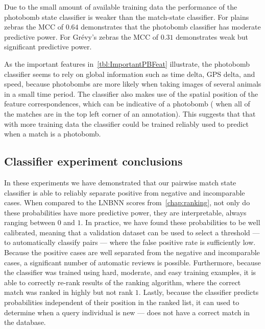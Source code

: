         Due to the small amount of available training data the performance of the photobomb state classifier is
          weaker than the match-state classifier.
        For plains zebras the MCC of $0.64$ demonstrates that the photobomb classifier has moderate predictive
          power.
        For Grévy's zebras the MCC of $0.31$ demonstrates weak but significant predictive power.

        As the important features in~\cref{tbl:ImportantPBFeat} illustrate, the photobomb classifier seems to
          rely on global information such as time delta, GPS delta, and speed, because photobombs are more likely
          when taking images of several animals in a small time period.
        The classifier also makes use of the spatial position of the feature correspondences, which can be
          indicative of a photobomb (\eg{} when all of the matches are in the top left corner of an annotation).
        This suggests that that with more training data the classifier could be trained reliably used to predict
          when a match is a photobomb.

        \ConfusionPhotobomb{}

        \EvalMetricsPhotobomb{}

        \ImportantPBFeat{}

    \FloatBarrier{}
    \subsection{Classifier experiment conclusions}
        In these experiments we have demonstrated that our pairwise match state classifier is able to reliably
          separate positive from negative and incomparable cases.
        When compared to the LNBNN scores from~\cref{chap:ranking}, not only do these probabilities have more
          predictive power, they are interpretable, always ranging between $0$ and $1$.
        In practice, we have found these probabilities to be well calibrated, meaning that a validation dataset
          can be used to select a threshold --- to automatically classify pairs --- where the false positive rate
          is sufficiently low.
        Because the positive cases are well separated from the negative and incomparable cases, a significant
          number of automatic reviews is possible.
        Furthermore, because the classifier was trained using hard, moderate, and easy training examples, it is
          able to correctly re-rank results of the ranking algorithm, where the correct match was ranked in highly
          but not rank $1$.
        Lastly, because the classifier predicts probabilities independent of their position in the ranked list,
          it can used to determine when a query individual is new --- \ie{} does not have a correct match in the
          database.

